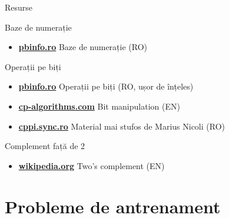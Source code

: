 ﻿\documentclass{beamer}
\begin{document}
\begin{frame}{Resurse}
  \begin{block}{Baze de numerație}
    \begin{itemize}
      \item \href{https://www.pbinfo.ro/articole/5562/baze-de-numeratie}{\textbf{pbinfo.ro}} \textemdash{} Baze de numerație (RO)
    \end{itemize}
  \end{block}
  \begin{block}{Operații pe biți}
    \begin{itemize}
      \item \href{https://www.pbinfo.ro/articole/62/operatii-pe-biti}{\textbf{pbinfo.ro}} \textemdash{} Operații pe biți (RO, ușor de înțeles)
      \item \href{https://cp-algorithms.com/algebra/bit-manipulation.html}{\textbf{cp-algorithms.com}} \textemdash{} Bit manipulation (EN)
      \item \href{https://cppi.sync.ro/materia/lectii/baze\%20de\%20numeratie,\%20scrierea\%20constantelor\%20si\%20operatii\%20pe\%20biti.pdf}{\textbf{cppi.sync.ro}} \textemdash{} Material mai stufos de Marius Nicoli (RO)
    \end{itemize}
  \end{block}
  \begin{block}{Complement față de 2}
    \begin{itemize}
      \item \href{https://en.wikipedia.org/wiki/Two\%27s_complement}{\textbf{wikipedia.org}} \textemdash{} Two's complement (EN)
    \end{itemize}
  \end{block}
\end{frame}

\section{Probleme de antrenament}
\end{document}
